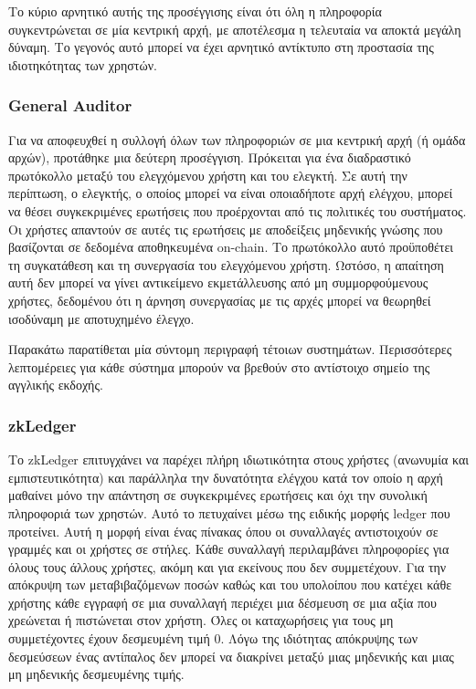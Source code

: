 Το κύριο αρνητικό αυτής της προσέγγισης είναι ότι όλη η πληροφορία συγκεντρώνεται σε μία κεντρική αρχή, με αποτέλεσμα η τελευταία να αποκτά μεγάλη δύναμη.  Το γεγονός αυτό μπορεί να έχει αρνητικό αντίκτυπο στη προστασία της ιδιοτηκότητας των χρηστών.

\subsubsection{General Auditor}
Για να αποφευχθεί η συλλογή όλων των πληροφοριών σε μια κεντρική αρχή (ή ομάδα αρχών), προτάθηκε μια δεύτερη προσέγγιση. Πρόκειται για ένα διαδραστικό πρωτόκολλο μεταξύ του ελεγχόμενου χρήστη και του ελεγκτή. Σε αυτή την περίπτωση, ο ελεγκτής, ο οποίος μπορεί να είναι οποιαδήποτε αρχή ελέγχου, μπορεί να θέσει συγκεκριμένες ερωτήσεις που προέρχονται από τις πολιτικές του συστήματος. Οι χρήστες απαντούν σε αυτές τις ερωτήσεις με αποδείξεις μηδενικής γνώσης που βασίζονται σε δεδομένα αποθηκευμένα on-chain. Το πρωτόκολλο αυτό προϋποθέτει τη συγκατάθεση και τη συνεργασία του ελεγχόμενου χρήστη. Ωστόσο, η απαίτηση αυτή δεν μπορεί να γίνει αντικείμενο εκμετάλλευσης από μη συμμορφούμενους χρήστες, δεδομένου ότι η άρνηση συνεργασίας με τις αρχές μπορεί να θεωρηθεί ισοδύναμη με αποτυχημένο έλεγχο.

Παρακάτω παρατίθεται μία σύντομη περιγραφή τέτοιων συστημάτων. Περισσότερες λεπτομέρειες για κάθε σύστημα μπορούν να βρεθούν στο αντίστοιχο σημείο της αγγλικής εκδοχής.

\subsubsection{zkLedger}
Το zkLedger επιτυγχάνει να παρέχει πλήρη ιδιωτικότητα στους χρήστες (ανωνυμία και εμπιστευτικότητα) και παράλληλα την δυνατότητα ελέγχου κατά τον οποίο η αρχή μαθαίνει μόνο την απάντηση σε συγκεκριμένες ερωτήσεις και όχι την συνολική πληροφοριά των χρηστών. Αυτό το πετυχαίνει μέσω της ειδικής μορφής ledger που προτείνει. Αυτή η μορφή είναι ένας πίνακας όπου οι συναλλαγές αντιστοιχούν σε γραμμές και οι χρήστες σε στήλες. Κάθε συναλλαγή περιλαμβάνει πληροφορίες για όλους τους άλλους χρήστες, ακόμη και για εκείνους που δεν συμμετέχουν. Για την απόκρυψη των μεταβιβαζόμενων ποσών καθώς και του υπολοίπου που κατέχει κάθε χρήστης κάθε εγγραφή σε μια συναλλαγή περιέχει μια δέσμευση σε μια αξία που χρεώνεται ή πιστώνεται στον χρήστη. Όλες οι καταχωρήσεις για τους μη συμμετέχοντες έχουν δεσμευμένη τιμή 0. Λόγω της ιδιότητας απόκρυψης των δεσμεύσεων ένας αντίπαλος δεν μπορεί να διακρίνει μεταξύ μιας μηδενικής και μιας μη μηδενικής δεσμευμένης τιμής. 

